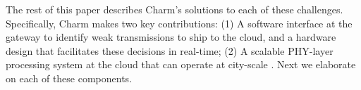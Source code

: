  The rest of this paper describes Charm's solutions to each of these
 challenges. Specifically, Charm makes two key contributions: (1) A software
 interface at the gateway to identify weak transmissions to ship to the cloud,
 and a hardware design that facilitates these decisions in real-time; (2) A
  scalable %
 PHY-layer processing system at the cloud that can operate
 at city-scale . Next we elaborate on each of these components.







